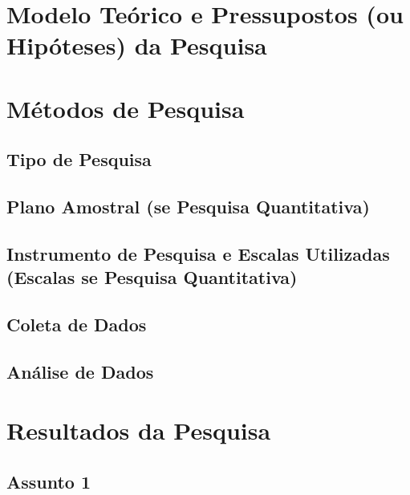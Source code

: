 
\chapter{Modelo Teórico e Pressupostos (ou Hipóteses) da Pesquisa}
\lipsum[5-10]




\chapter{Métodos de Pesquisa}
\lipsum[3]

\section{Tipo de Pesquisa}
\lipsum[3-5]

\section{Plano Amostral (se Pesquisa Quantitativa)}
\lipsum[3-5]

\section{Instrumento de Pesquisa e Escalas Utilizadas (Escalas se Pesquisa Quantitativa)}
\lipsum[3-5]

\section{Coleta de Dados}
\lipsum[3-5]

\section{Análise de Dados}
\lipsum[3-5]


\chapter{Resultados da Pesquisa}
\lipsum[2]

\section{Assunto 1}
\lipsum[3-5]

